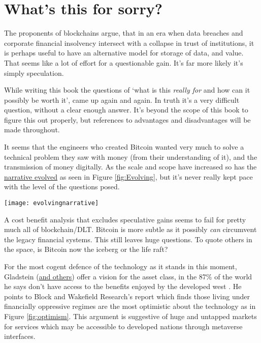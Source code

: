 \section{What's this for sorry?}
The proponents of blockchains argue, that in an era when data breaches and corporate financial insolvency intersect with a collapse in trust of institutions, it is perhaps useful to have an alternative model for storage of data, and value. That seems like a lot of effort for a questionable gain. It's far more likely it's simply speculation.\par 
While writing this book the questions of `what is this \textit{really for} and how can it possibly be worth it', came up again and again. In truth it's a very difficult question, without a clear enough answer. It's beyond the scope of this book to figure this out properly, but references to advantages and disadvantages will be made throughout.\par  
It seems that the engineers who created Bitcoin wanted very much to solve a technical problem they saw with money (from their understanding of it), and the transmission of money digitally. As the scale and scope have increased so has the \href{https://medium.com/@nic__carter/visions-of-bitcoin-4b7b7cbcd24c}{narrative evolved} as seen in Figure \ref{fig:Evolving}, but it's never really kept pace with the level of the questions posed. \par
\begin{figure*}[ht]\centering %
	\texttt{[image: evolvingnarrative]}
	\caption{The narrative use of Bitcoin has evolved, by Nic Carter and Hasufly.}
	\label{fig:Evolving}
\end{figure*}
A cost benefit analysis that excludes speculative gains seems to fail for pretty much all of blockchain/DLT. Bitcoin is more subtle as it possibly \textit{can} circumvent the legacy financial systems. This still leaves huge questions. To quote others in the space, is Bitcoin now the iceberg or the life raft? \par 
For the most cogent defence of the technology as it stands in this moment, Gladstein (\href{https://www.financialinclusion.tech/}{and others}) offer a vision for the asset class, in the 87\% of the world he says don't have access to the benefits enjoyed by the developed west \cite{gladsteincheck2022}. He points to Block and Wakefield Research's report which finds those living under financially oppressive regimes are the most optimistic about the technology as in Figure \ref{fig:optimism}. This argument is suggestive of huge and untapped markets for services which may be accessible to developed nations through metaverse interfaces.\par 
